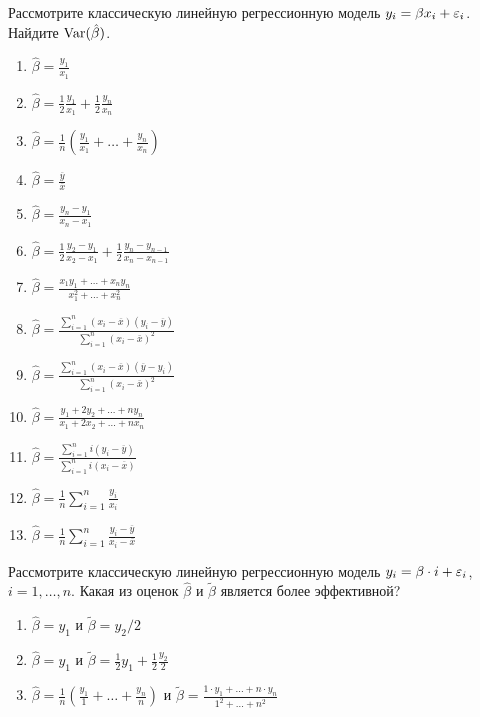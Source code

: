 \documentclass[pdftex,11pt,openany]{book}
\begin{document}
\begin{solution}
\end{solution}



\begin{problem}
 Рассмотрите классическую линейную регрессионную модель $y_i = \beta x_i + \varepsilon_i$. Найдите $\operatorname{Var}(\hat{\beta})$.

\begin{enumerate}
\item $\hat{\beta} = \frac{y_1}{x_1}$
\item $\hat{\beta} = \frac{1}{2} \frac{y_1}{x_1} + \frac{1}{2} \frac{y_n}{x_n}$
\item $\hat{\beta} = \frac{1}{n} \left( \frac{y_1}{x_1} + \ldots + \frac{y_n}{x_n} \right)$
\item $\hat{\beta} = \frac{\overline{y}}{\overline{x}}$
\item $\hat{\beta} = \frac{y_n - y_1}{x_n - x_1}$
\item $\hat{\beta} = \frac{1}{2} \frac{y_2 - y_1}{x_2 - x_1} + \frac{1}{2} \frac{y_n - y_{n-1}}{x_n - x_{n-1}}$
\item $\hat{\beta} = \frac{x_1 y_1 + \ldots + x_n y_n}{x_1^2 + \ldots + x_n^2}$
\item $\hat{\beta} = \frac{\sum_{i=1}^n (x_i - \overline{x})(y_i - \overline{y})}{\sum_{i=1}^n (x_i - \bar{x})^2}$
\item $\hat{\beta} = \frac{\sum_{i=1}^n (x_i - \overline{x})(\overline{y} - y_i)}{\sum_{i=1}^n (x_i - \bar{x})^2}$
\item $\hat{\beta} = \frac{y_1 + 2 y_2 + \ldots + n y_n}{x_1 + 2 x_2 + \ldots + n x_n}$
\item $\hat{\beta} = \frac{\sum_{i=1}^n i(y_i - \overline{y})}{\sum_{i=1}^n i(x_i - \overline{x})}$
\item $\hat{\beta} = \frac{1}{n} \sum_{i=1}^n \frac{y_i}{x_i}$
\item $\hat{\beta} = \frac{1}{n} \sum_{i=1}^n \frac{y_i - \overline{y}}{x_i - \overline{x}}$
\end{enumerate}
\end{problem}

\begin{solution}
\end{solution}



\begin{problem}
 Рассмотрите классическую линейную регрессионную модель $y_i = \beta \cdot i + \varepsilon_i$, $i=1, \ldots, n$. Какая из оценок $\hat{\beta}$ и $\tilde{\beta}$ является более эффективной?

\begin{enumerate}
\item $\hat{\beta} = y_1$ и $\tilde{\beta} = y_2/2$
\item $\hat{\beta} = y_1$ и $\tilde{\beta} = \frac{1}{2} y_1 + \frac{1}{2} \frac{y_2}{2}$
\item $\hat{\beta} = \frac{1}{n} \left(  \frac{y_1}{1} + \ldots + \frac{y_n}{n} \right) $ и $\tilde{\beta} = \frac{1 \cdot y_1 + \ldots + n \cdot y_n}{1^2 + \ldots + n^2}$
\end{enumerate} 
\end{problem}
\end{document}

